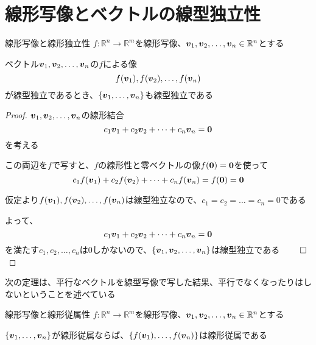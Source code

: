 \documentclass[../../../topic_linear-algebra]{subfiles}
\begin{document}
\sectionline
\section{線形写像とベクトルの線型独立性}

\begin{theorem}{線形写像と線形独立性}
  $f\colon \mathbb{R}^n \to \mathbb{R}^m$を線形写像、$\vb*{v}_1, \vb*{v}_2, \dots, \vb*{v}_n \in \mathbb{R}^n$とする

  ベクトル$\vb*{v}_1, \vb*{v}_2, \dots, \vb*{v}_n$の$f$による像
  \begin{equation*}
    f(\vb*{v}_1), f(\vb*{v}_2), \dots, f(\vb*{v}_n)
  \end{equation*}
  が線型独立であるとき、$\{ \vb*{v}_1, \dots, \vb*{v}_n \}$も線型独立である
\end{theorem}

\begin{proof}
  $\vb*{v}_1, \vb*{v}_2, \dots, \vb*{v}_n$の線形結合
  \begin{equation*}
    c_1 \vb*{v}_1 + c_2 \vb*{v}_2 + \dots + c_n \vb*{v}_n = \vb*{0}
  \end{equation*}
  を考える

  この両辺を$f$で写すと、$f$の線形性と零ベクトルの像$f(\vb*{0}) = \vb*{0}$を使って
  \begin{equation*}
    c_1 f(\vb*{v}_1) + c_2 f(\vb*{v}_2) + \dots + c_n f(\vb*{v}_n) = f(\vb*{0}) = \vb*{0}
  \end{equation*}

  仮定より$f(\vb*{v}_1), f(\vb*{v}_2), \dots, f(\vb*{v}_n)$は線型独立なので、$c_1 = c_2 = \dots = c_n = 0$である

  よって、
  \begin{equation*}
    c_1 \vb*{v}_1 + c_2 \vb*{v}_2 + \dots + c_n \vb*{v}_n = \vb*{0}
  \end{equation*}
  を満たす$c_1, c_2, \dots, c_n$は0しかないので、$\{ \vb*{v}_1, \vb*{v}_2, \dots, \vb*{v}_n \}$は線型独立である $\qed$
\end{proof}

\sectionline

次の定理は、平行なベクトルを線型写像で写した結果、平行でなくなったりはしないということを述べている

\begin{theorem}{線形写像と線形従属性}
  $f\colon \mathbb{R}^n \to \mathbb{R}^m$を線形写像、$\vb*{v}_1, \vb*{v}_2, \dots, \vb*{v}_n \in \mathbb{R}^n$とする

  $\{\vb*{v}_1, \dots, \vb*{v}_n\}$が線形従属ならば、$\{ f(\vb*{v}_1),  \dots, f(\vb*{v}_n) \}$は線形従属である
\end{theorem}
\end{document}
